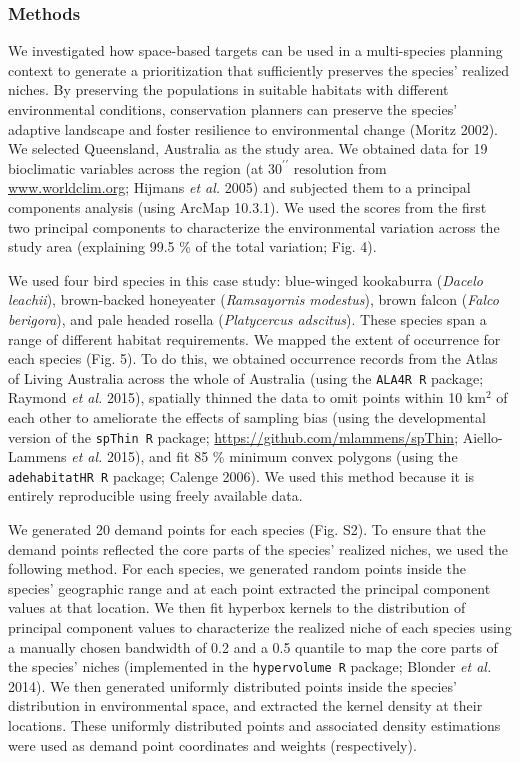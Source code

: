 \subsubsection{Methods}\label{methods-2}

We investigated how space-based targets can be used in a multi-species
planning context to generate a prioritization that sufficiently
preserves the species' realized niches. By preserving the populations in
suitable habitats with different environmental conditions, conservation
planners can preserve the species' adaptive landscape and foster
resilience to environmental change (Moritz 2002). We selected
Queensland, Australia as the study area. We obtained data for 19
bioclimatic variables across the region (at \(30^{\prime \prime}\)
resolution from \url{www.worldclim.org}; Hijmans \emph{et al.} 2005) and
subjected them to a principal components analysis (using ArcMap 10.3.1).
We used the scores from the first two principal components to
characterize the environmental variation across the study area
(explaining 99.5 \% of the total variation; Fig. 4).

We used four bird species in this case study: blue-winged kookaburra
(\emph{Dacelo leachii}), brown-backed honeyeater (\emph{Ramsayornis
modestus}), brown falcon (\emph{Falco berigora}), and pale headed
rosella (\emph{Platycercus adscitus}). These species span a range of
different habitat requirements. We mapped the extent of occurrence for
each species (Fig. 5). To do this, we obtained occurrence records from
the Atlas of Living Australia across the whole of Australia (using the
\texttt{ALA4R R} package; Raymond \emph{et al.} 2015), spatially thinned
the data to omit points within 10 km\(^2\) of each other to ameliorate
the effects of sampling bias (using the developmental version of the
\texttt{spThin R} package; \url{https://github.com/mlammens/spThin};
Aiello-Lammens \emph{et al.} 2015), and fit 85 \% minimum convex
polygons (using the \texttt{adehabitatHR R} package; Calenge 2006). We
used this method because it is entirely reproducible using freely
available data.

We generated 20 demand points for each species (Fig. S2). To ensure that
the demand points reflected the core parts of the species' realized
niches, we used the following method. For each species, we generated
random points inside the species' geographic range and at each point
extracted the principal component values at that location. We then fit
hyperbox kernels to the distribution of principal component values to
characterize the realized niche of each species using a manually chosen
bandwidth of 0.2 and a 0.5 quantile to map the core parts of the
species' niches (implemented in the \texttt{hypervolume R} package;
Blonder \emph{et al.} 2014). We then generated uniformly distributed
points inside the species' distribution in environmental space, and
extracted the kernel density at their locations. These uniformly
distributed points and associated density estimations were used as
demand point coordinates and weights (respectively).

